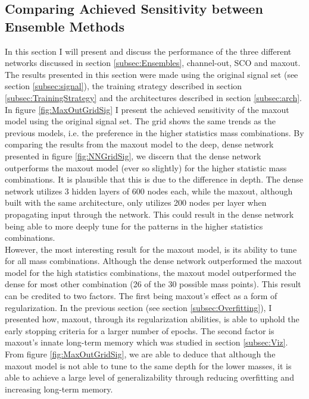 \subsection{Comparing Achieved Sensitivity between Ensemble Methods}
In this section I will present and discuss the performance of the three different networks discussed in section 
\ref{subsec:Ensembles}, channel-out, \ac{SCO} and maxout. The results presented in this section were made using the
original signal set (see section \ref{subsec:signal}), the training strategy described in section \ref{subsec:TrainingStrategy}
and the architectures described in section \ref{subsec:arch}.
\\
In figure \ref{fig:MaxOutGridSig} I present the achieved sensitivity of the maxout model using the original signal set. 
The grid shows the same trends as the previous models, i.e. the preference in the higher statistics mass combinations. By comparing 
the results from the maxout model to the deep, dense network presented in figure \ref{fig:NNGridSig}, we discern that the dense 
network outperforms the maxout model (ever so slightly) for the higher statistic mass combinations. It is plausible that this is due 
to the difference in depth. The dense network utilizes 3 hidden layers of 600 nodes each, while the maxout, although built with the 
same architecture, only utilizes 200 nodes per layer when propagating input through the network. This could result in the dense network 
being able to more deeply tune for the patterns in the higher statistics combinations.
\\
However, the most interesting result for the maxout model, is its ability to tune for all mass combinations. Although the dense network
outperformed the maxout model for the high statistics combinations, the maxout model outperformed the dense for most other combination (26 of 
the 30 possible mass points). This result can be credited to two factors. The first being maxout's effect as a form of regularization. In the previous 
section (see section \ref{subsec:Overfitting}), I presented how, maxout, through its regularization abilities, is able to 
uphold the early stopping criteria for a larger number of epochs. The second factor is maxout's innate long-term memory which was studied
in section \ref{subsec:Viz}. From figure \ref{fig:MaxOutGridSig}, we are able to deduce that although the maxout model is not able to tune 
to the same depth for the lower masses, it is able to achieve a large level of generalizability through reducing overfitting and increasing 
long-term memory.\\
